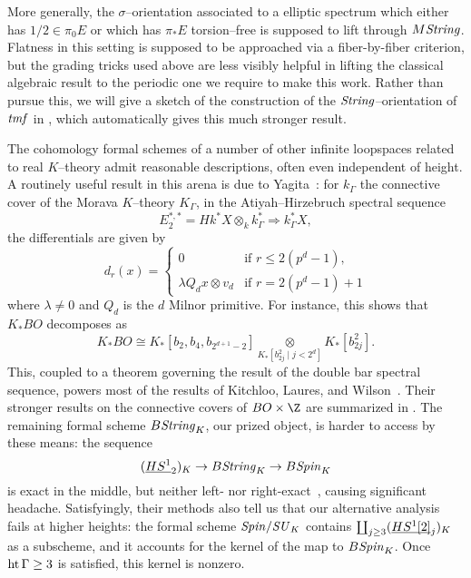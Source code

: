 \begin{remark}
More generally, the \(\sigma\)--orientation associated to a elliptic spectrum which either has \(1/2 \in \pi_0 E\) or which has \(\pi_* E\) torsion--free is supposed to lift through \(M\mathit{String}\).  Flatness in this setting is supposed to be approached via a fiber-by-fiber criterion, but the grading tricks used above are less visibly helpful in lifting the classical algebraic result to the periodic one we require to make this work.  Rather than pursue this, we will give a sketch of the construction of the \(\mathit{String}\)--orientation of \(\mathit{tmf}\) in , which automatically gives this much stronger result.
\end{remark}

\begin{remark}
The cohomology formal schemes of a number of other infinite loopspaces related to real \(K\)--theory admit reasonable descriptions, often even independent of height.  A routinely useful result in this arena is due to Yagita~\cite[Lemma 2.1]{Yagita}: for \(k_\Gamma\) the connective cover of the Morava \(K\)--theory \(K_\Gamma\), in the Atiyah--Hirzebruch spectral sequence \[E_2^{*, *} = Hk^* X \otimes_k k_\Gamma^* \Rightarrow k_\Gamma^* X,\] the differentials are given by \[d_r(x) = \begin{cases} 0 & \text{if \(r \le 2(p^d - 1)\)}, \\ \lambda Q_d x \otimes v_d & \text{if \(r = 2(p^d - 1) + 1\)} \end{cases}\] where \(\lambda \ne 0\) and \(Q_d\) is the \(d\){\th} Milnor primitive.  For instance, this shows that \(K_* BO\) decomposes as \[K_* BO \cong K_*[b_2, b_4, b_{2^{d+1}-2}] \underset{K_*[b_{2j}^2 \mid j < 2^d]}{\otimes} K_*[b_{2j}^2].\]  This, coupled to a theorem governing the result of the double bar spectral sequence, powers most of the results of Kitchloo, Laures, and Wilson~\cite[Section 4]{KLW}.  Their stronger results on the connective covers of \(BO \times \Z\) are summarized in .  The remaining formal scheme \(B\mathit{String}_K\), our prized object, is harder to access by these means: the sequence \[(\OS{HS^1}{2})_K \to B\String_K \to B\Spin_K\] is exact in the middle, but neither left- nor right-exact~\cite[pg.\ 234]{KLW}, causing significant headache.  Satisfyingly, their methods also tell us that our alternative analysis fails at higher heights: the formal scheme \(\mathit{Spin}/\mathit{SU}_K\) contains \(\coprod_{j \ge 3} (\OS{HS^1[2]}{j})_K\) as a subscheme, and it accounts for the kernel of the map to \(B\mathit{Spin}_K\).  Once \(\operatorname{ht} \Gamma \ge 3\) is satisfied, this kernel is nonzero.
\end{remark}

